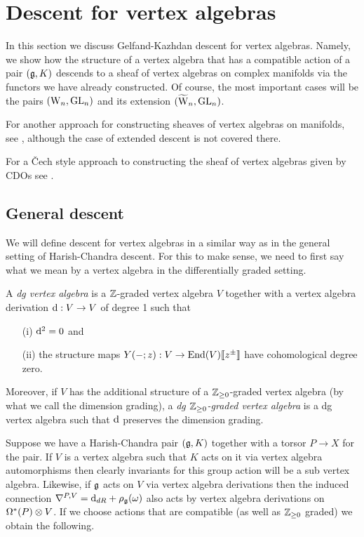\section{Descent for vertex algebras} \label{sec vertex desc}

In this section we discuss Gelfand-Kazhdan descent for vertex
algebras. Namely, we show how the structure of a vertex algebra that
has a compatible action of a pair $(\mathfrak g, K)$ descends to a sheaf of
vertex algebras on complex manifolds via the functors we have already
constructed. Of course, the most important cases will be the pairs
$({{\rm W}_n}, {\rm GL}_n)$ and its extension $(\widetilde{{{\rm W}}}_n, {\rm GL}_n)$. 

For another approach for constructing sheaves of vertex algebras on manifolds, 
see \cite{Malikov2008},  although the case of extended descent is not covered there. 

For a \v{C}ech style approach to constructing the sheaf of vertex
algebras given by CDOs see \cite{GMS2}. 

\subsection{General descent} \label{gendescent}

We will define descent for vertex algebras in a
similar way as in the general setting of Harish-Chandra descent. For this
to make sense, we need to first say what we mean by a vertex algebra
in the differentially graded setting. 

\begin{dfn} 
A {\em dg vertex algebra} is a $\mathbb Z$-graded vertex algebra $V$ 
together with a vertex algebra derivation ${\rm d} : V \to V$ of degree 1 such that
\begin{itemize}
\item[(i)] ${\rm d}^2 = 0$ and
\item[(ii)] the structure maps $Y(-; z) : V \to {\rm End}(V) \llbracket z^\pm \rrbracket$ have cohomological degree zero.
\end{itemize}
Moreover, if $V$ has the additional structure of a $\mathbb Z_{\geq 0}$-graded vertex algebra 
(by what we call the dimension grading), 
a {\em dg $\mathbb Z_{\geq 0}$-graded vertex algebra} is a dg vertex algebra such that
${\rm d}$ preserves the dimension grading. 
\end{dfn}

Suppose we have a Harish-Chandra pair $(\mathfrak g, K)$ together with a
torsor $P \to X$ for the pair. If $V$ is a vertex algebra such that
$K$ acts on it via vertex algebra automorphisms then clearly
invariants for this group action will be a sub vertex
algebra. Likewise, if $\mathfrak g$ acts on $V$ via vertex algebra derivations
then the induced connection $\nabla^{P,V} = {\rm d}_{dR} +
\rho_\mathfrak g(\omega)$ also acts by vertex algebra derivations on
$\Omega^*(P) \otimes V$. If we choose actions that are compatible (as
well as $\mathbb Z_{\geq 0}$ graded) we
obtain the following. 

